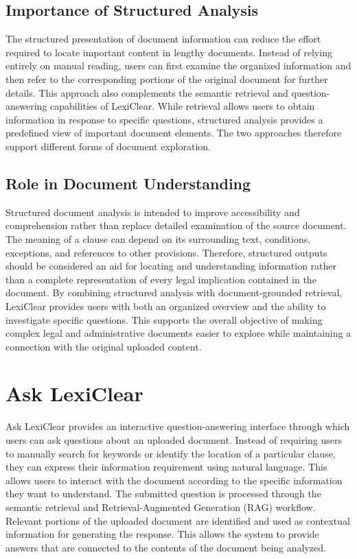 \documentclass[12pt,a4paper,oneside]{report}
\begin{document}
\subsection{Importance of Structured Analysis}

The structured presentation of document information can reduce the effort
required to locate important content in lengthy documents. Instead of relying
entirely on manual reading, users can first examine the organized information
and then refer to the corresponding portions of the original document for
further details. This approach also complements the semantic retrieval and question-answering
capabilities of LexiClear. While retrieval allows users to obtain information
in response to specific questions, structured analysis provides a predefined
view of important document elements. The two approaches therefore support
different forms of document exploration.

\subsection{Role in Document Understanding}

Structured document analysis is intended to improve accessibility and
comprehension rather than replace detailed examination of the source
document. The meaning of a clause can depend on its surrounding text,
conditions, exceptions, and references to other provisions. Therefore,
structured outputs should be considered an aid for locating and understanding
information rather than a complete representation of every legal implication
contained in the document. By combining structured analysis with document-grounded retrieval, LexiClear
provides users with both an organized overview and the ability to investigate
specific questions. This supports the overall objective of making complex
legal and administrative documents easier to explore while maintaining a
connection with the original uploaded content.

\section{Ask LexiClear}

Ask LexiClear provides an interactive question-answering interface through
which users can ask questions about an uploaded document. Instead of requiring
users to manually search for keywords or identify the location of a particular
clause, they can express their information requirement using natural
language. This allows users to interact with the document according to the
specific information they want to understand. The submitted question is processed through the semantic retrieval and
Retrieval-Augmented Generation (RAG) workflow. Relevant portions of the
uploaded document are identified and used as contextual information for
generating the response. This allows the system to provide answers that are
connected to the contents of the document being analyzed.
\end{document}
